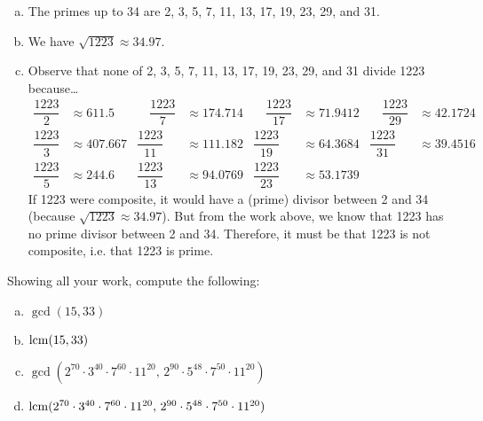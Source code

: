 \documentclass[11pt,letterpaper]{article}
\begin{document}
\sol 
\begin{enumerate}[(a)]
\item The primes up to 34 are 2, 3, 5, 7, 11, 13, 17, 19, 23, 29, and 31. \pspace

\item We have $\sqrt{1223} \approx 34.97$. \pspace

\item Observe that none of 2, 3, 5, 7, 11, 13, 17, 19, 23, 29, and 31 divide 1223 because\dots
	\[
	\begin{aligned}
	\dfrac{1223}{2}&\approx 611.5 &\quad \dfrac{1223}{7}&\approx 174.714 &\quad \dfrac{1223}{17}&\approx 71.9412 &\quad \dfrac{1223}{29}&\approx 42.1724 \\
	\dfrac{1223}{3}&\approx 407.667 & \dfrac{1223}{11}&\approx 111.182 & \dfrac{1223}{19}&\approx 64.3684 & \dfrac{1223}{31}&\approx 39.4516 \\
	\dfrac{1223}{5}&\approx 244.6 & \dfrac{1223}{13}&\approx 94.0769 & \dfrac{1223}{23}&\approx 53.1739
	\end{aligned}
	\]
If 1223 were composite, it would have a (prime) divisor between 2 and 34 (because $\sqrt{1223} \approx 34.97$). But from the work above, we know that 1223 has no prime divisor between 2 and 34. Therefore, it must be that 1223 is not composite, i.e. that 1223 is prime. 
\end{enumerate}



\newpage



 Showing all your work, compute the following:
	\begin{enumerate}[(a)]
	\item $\gcd(15, 33)$
	\item $\operatorname{lcm}(15, 33)$
	\item $\gcd(2^{70} \cdot 3^{40} \cdot 7^{60} \cdot 11^{20},\, 2^{90} \cdot 5^{48} \cdot 7^{50} \cdot 11^{20})$
	\item $\operatorname{lcm}(2^{70} \cdot 3^{40} \cdot 7^{60} \cdot 11^{20},\, 2^{90} \cdot 5^{48} \cdot 7^{50} \cdot 11^{20})$
	\end{enumerate} \pspace
\end{document}
